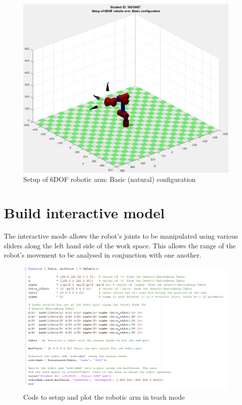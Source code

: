 \documentclass [11pt]{report}
\begin{document}
\begin{figure}[H]
\centerline{\includegraphics[width=12cm]{StaticRoboticArm.png}}
\caption{Setup of 6DOF robotic arm: Basic (natural) configuration}
\label{fig}
\end{figure}

\newpage
\section{Build interactive model}

The interactive mode allows the robot's joints to be manipulated using various sliders along the left hand side of the work space. This allows the range of the robot's movement to be analysed in conjunction with one another.

\begin{figure}[H]
\centerline{\includegraphics[width=14cm]{teachRobotArmCode.png}}
\caption{Code to setup and plot the robotic arm in teach mode}
\label{fig}
\end{figure}
\end{document}
